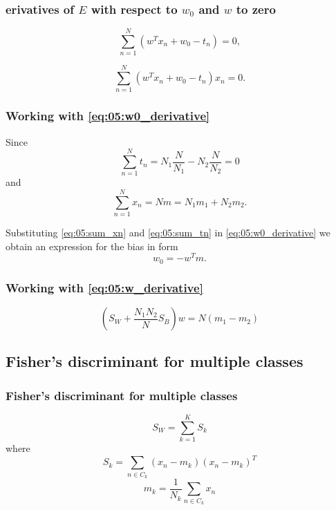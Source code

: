 \begin{frame}
    \frametitle{erivatives of $E$ with respect to $w_0$ and $w$ to zero}
    \begin{equation}\label{eq:05:w0_derivative}
        \sum_{n = 1}^N (w^T x_n + w_0 - t_n) = 0,
    \end{equation}

    \begin{equation}\label{eq:05:w_derivative}
        \sum_{n = 1}^N (w^T x_n + w_0 - t_n)x_n = 0.
    \end{equation}
\end{frame}

\begin{frame}
    \frametitle{Working with \ref{eq:05:w0_derivative}}
    Since 
    \begin{equation} \label{eq:05:sum_tn}
        \sum_{n = 1}^N t_n 
        = 
        N_1 \frac{N}{N_1} 
        - 
        N_2 \frac{N}{N_2}
        = 0
    \end{equation}
    and 
    \begin{equation} \label{eq:05:sum_xn}
        \sum_{n = 1}^N x_n 
        = N m
        = N_1 m_1 + N_2 m_2.
    \end{equation}

   Substituting  \ref{eq:05:sum_xn} and   \ref{eq:05:sum_tn} in \ref{eq:05:w0_derivative}
   we obtain an expression for the bias in form 
   \begin{equation}
    w_0 = -w^T m.
   \end{equation}

\end{frame}

\begin{frame}
    \frametitle{Working with  \ref{eq:05:w_derivative}}

    \begin{equation}
        \left(
            S_W + \frac{N_1 N_2}{N}S_B
        \right)
        w
        = 
        N (m_1 - m_2)
    \end{equation}
\end{frame}

\subsection{Fisher's discriminant for multiple classes}

\begin{frame}
    \frametitle{Fisher's discriminant for multiple classes}

    \begin{equation}
        S_W 
        =
        \sum_{k = 1}^K S_k 
    \end{equation}
    where 
    \begin{equation}
        S_k = 
        \sum_{n \in C_k}
        (x_n - m_k)(x_n - m_k)^T
    \end{equation}
    \begin{equation}
        m_k 
        = 
        \frac{1}{N_k}
        \sum_{n \in C_k}
        x_n
    \end{equation}
    
\end{frame}

